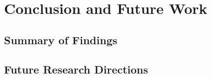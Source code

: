 \chapter{Conclusion and Future Work}

\section{Summary of Findings}

\section{Future Research Directions}
